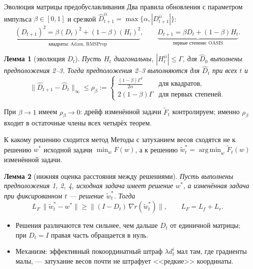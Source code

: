 \documentclass[aspectratio=169, 12pt]{beamer}
\DeclareMathOperator*{\argmin}{arg\,min}
\newtheorem*{lemma_rus}{Лемма}
\begin{document}
\begin{frame}{Эволюция матрицы предобуславливания}
\small
Два правила обновления с параметром импульса $\beta \in [0,1]$ и срезкой $\hat{D}_{t+1}^{ii} = \max \{ \alpha, |D_{t+1}^{ii}| \}$:
\begin{equation*}
    \underbrace{(D_{t+1})^2 = \beta (D_t)^2 + (1 - \beta) (H_t)^2}_{\text{квадраты: Adam, RMSProp}}, \qquad
    \underbrace{D_{t+1} = \beta D_t + (1 - \beta) H_t}_{\text{первые степени: OASIS}}.
\end{equation*}
\begin{lemma_rus}[эволюция $D_t$]
    \small
    Пусть $H_t$ диагональны, $|H_t^{ii}| \le \Gamma$, для $\hat D_0$ выполнены предположения 2--3. Тогда предположения 2--3 выполняются для $\hat{D}_t$ при всех $t$ и
    \vspace{-0.1cm}
    \begin{equation*}
        \|\hat{D}_{t+1} - \hat{D}_t\|_\infty \le \rho_\beta := \begin{cases}
            \frac{(1 - \beta)\Gamma^2}{2\alpha} & \text{для квадратов,} \\
            2(1 - \beta)\Gamma & \text{для первых степеней.}
        \end{cases}
    \end{equation*}
\end{lemma_rus}
При $\beta \to 1$ имеем $\rho_\beta \to 0$: дрейф изменённой задачи $\widetilde{F}_t$ контролируем; именно $\rho_\beta$ входит в остаточные члены всех четырёх теорем.
\end{frame}

\begin{frame}{К какому решению сходится метод}
Методы с затуханием весов сходятся не к решению $w^*$ исходной задачи $\min_w F(w)$, а к решению $\widetilde{w}^*_t = \argmin_w \widetilde{F}_t(w)$ изменённой задачи.
\begin{lemma_rus}[нижняя оценка расстояния между решениями]
    \small
    Пусть выполнены предположения 1, 2, 4, исходная задача имеет решение $w^*$, а изменённая задача при фиксированном $t$ --- решение $\widetilde{w}^*_t$. Тогда
    \begin{equation*}
        L_F \, \|\widetilde{w}^*_t - w^* \| \geq \| (I - D_t)\, \nabla r (\widetilde{w}^*_t)\|,
        \qquad L_F = L_f + L_r.
    \end{equation*}
\end{lemma_rus}
\begin{itemize}
    \small
    \item Решения различаются тем сильнее, чем дальше $D_t$ от единичной матрицы; при $D_t = I$ правая часть обращается в нуль.
    \item Механизм: эффективный покоординатный штраф $\lambda d_t^i$ мал там, где градиенты малы, --- затухание весов почти не штрафует <<редкие>> координаты.
\end{itemize}
\end{frame}
\end{document}
